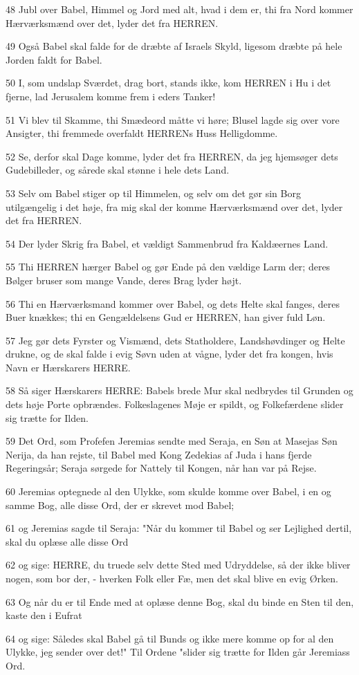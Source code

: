 \par 48 Jubl over Babel, Himmel og Jord med alt, hvad i dem er, thi fra Nord kommer Hærværksmænd over det, lyder det fra HERREN.
\par 49 Også Babel skal falde for de dræbte af Israels Skyld, ligesom dræbte på hele Jorden faldt for Babel.
\par 50 I, som undslap Sværdet, drag bort, stands ikke, kom HERREN i Hu i det fjerne, lad Jerusalem komme frem i eders Tanker!
\par 51 Vi blev til Skamme, thi Smædeord måtte vi høre; Blusel lagde sig over vore Ansigter, thi fremmede overfaldt HERRENs Huss Helligdomme.
\par 52 Se, derfor skal Dage komme, lyder det fra HERREN, da jeg hjemsøger dets Gudebilleder, og sårede skal stønne i hele dets Land.
\par 53 Selv om Babel stiger op til Himmelen, og selv om det gør sin Borg utilgængelig i det høje, fra mig skal der komme Hærværksmænd over det, lyder det fra HERREN.
\par 54 Der lyder Skrig fra Babel, et vældigt Sammenbrud fra Kaldæernes Land.
\par 55 Thi HERREN hærger Babel og gør Ende på den vældige Larm der; deres Bølger bruser som mange Vande, deres Brag lyder højt.
\par 56 Thi en Hærværksmand kommer over Babel, og dets Helte skal fanges, deres Buer knækkes; thi en Gengældelsens Gud er HERREN, han giver fuld Løn.
\par 57 Jeg gør dets Fyrster og Vismænd, dets Statholdere, Landshøvdinger og Helte drukne, og de skal falde i evig Søvn uden at vågne, lyder det fra kongen, hvis Navn er Hærskarers HERRE.
\par 58 Så siger Hærskarers HERRE: Babels brede Mur skal nedbrydes til Grunden og dets høje Porte opbrændes. Folkeslagenes Møje er spildt, og Folkefærdene slider sig trætte for Ilden.
\par 59 Det Ord, som Profefen Jeremias sendte med Seraja, en Søn at Masejas Søn Nerija, da han rejste, til Babel med Kong Zedekias af Juda i hans fjerde Regeringsår; Seraja sørgede for Nattely til Kongen, når han var på Rejse.
\par 60 Jeremias optegnede al den Ulykke, som skulde komme over Babel, i en og samme Bog, alle disse Ord, der er skrevet mod Babel;
\par 61 og Jeremias sagde til Seraja: "Når du kommer til Babel og ser Lejlighed dertil, skal du oplæse alle disse Ord
\par 62 og sige: HERRE, du truede selv dette Sted med Udryddelse, så der ikke bliver nogen, som bor der, - hverken Folk eller Fæ, men det skal blive en evig Ørken.
\par 63 Og når du er til Ende med at oplæse denne Bog, skal du binde en Sten til den, kaste den i Eufrat
\par 64 og sige: Således skal Babel gå til Bunds og ikke mere komme op for al den Ulykke, jeg sender over det!" Til Ordene "slider sig trætte for Ilden går Jeremiass Ord.

